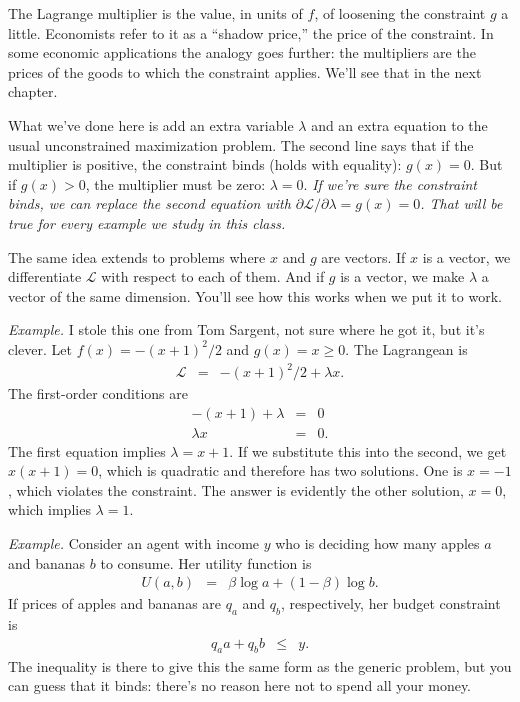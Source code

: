 \documentclass[11pt]{article}
\begin{document}
The Lagrange multiplier is the value, in units of $f$,
of loosening the constraint $g$ a little.
Economists refer to it as a ``shadow price,''
the price of the constraint.
In some economic applications the analogy goes further:
the multipliers are the prices of the goods to which the constraint applies.
We'll see that in the next chapter.

What we've done here is add an extra variable $\lambda$
and an extra equation to the usual unconstrained maximization problem.
The second line says that if the multiplier is positive,
the constraint binds (holds with equality):  $g(x) = 0$.
But if $g(x) > 0$, the multiplier must be zero:  $\lambda = 0$.
{\it If we're sure the constraint binds, we can replace the second equation
with $ \partial \mathcal{L}/\partial \lambda = g(x) = 0$.
That will be true for every example we study in this class.\/}

The same idea extends to problems where $x$ and $g$
are vectors.
If $x$ is a vector, we differentiate $\mathcal{L}$ with
respect to each of them.
And if $g$ is a vector, we make $\lambda$ a vector of the same
dimension.
You'll see how this works when we put it to work.


{\it Example.\/}
I stole this one from Tom Sargent, not sure where he got it, but it's clever.
Let $f(x) =- (x+1)^2/2$  and $g(x) = x \geq 0$.
The Lagrangean is
\begin{eqnarray*}
    \mathcal{L} &=& - (x+1)^2/2 + \lambda x .
\end{eqnarray*}
The first-order conditions are
\begin{eqnarray*}
    -(x+1) + \lambda &=& 0 \\
    \lambda x &=& 0.
\end{eqnarray*}
The first equation implies $\lambda = x + 1$.
If we substitute this into the second, we get $x(x+1) = 0$,
which is quadratic and therefore has two solutions.
One is $x=-1$, which violates the constraint.
The answer is evidently the other solution, $x=0$, which implies $\lambda = 1$.


{\it Example.\/}
Consider an agent with income $y$ who is deciding
how many apples $a$ and bananas $b$ to consume.
Her utility function is
\begin{eqnarray*}
    U(a,b) &=& \beta \log a + (1-\beta) \log b .
\end{eqnarray*}
If prices of apples and bananas are $q_a$ and $q_b$,
respectively, her budget constraint is
\begin{eqnarray*}
    q_a a + q_b b  &\leq& y  .
\end{eqnarray*}
The inequality is there to give this the same form as the
generic problem, but you can guess that it binds:
there's no reason here not to spend all your money.
\end{document}
